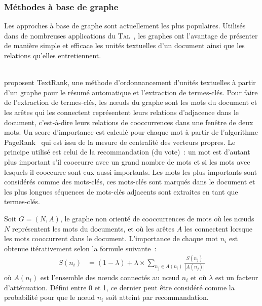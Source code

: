       \subsubsection{Méthodes à base de graphe}
      \label{subsubsec:main-state_of_the_art-automatic_keyphrase_extraction-unsupervised_keyphrase_extraction-graph_based_approaches}
        Les approches à base de graphe sont actuellement les plus populaires.
        Utilisés dans de nombreuses applications du
        \textsc{Tal}~\cite{kozareva2013textgraphs}, les graphes ont l'avantage
        de présenter de manière simple et efficace les unités textuelles d'un
        document ainsi que les relations qu'elles entretiennent.

        ~\\ proposent TextRank, une méthode
        d'ordonnancement d'unités textuelles à partir d'un graphe pour le résumé
        automatique et l'extraction de termes-clés. Pour faire de l'extraction
        de termes-clés, les n\oe{}uds du graphe sont les mots du document et les
        arêtes qui les connectent représentent leurs relations d'adjacence dans
        le document, c'est-à-dire leurs relations de cooccurrences dans une
        fenêtre de deux mots. Un score d'importance est calculé pour chaque mot
        à partir de l'algorithme PageRank~\cite{brin1998pagerank} qui est issu
        de la mesure de centralité des vecteurs propres. Le principe utilisé est
        celui de la recommandation (du vote)~: un mot est d'autant plus
        important s'il cooccurre avec un grand nombre de mots et si les mots
        avec lesquels il cooccurre sont eux aussi importants. Les mots les plus
        importants sont considérés comme des mots-clés, ces mots-clés sont
        marqués dans le document et les plus longues séquences de mots-clés
        adjacents sont extraites en tant que termes-clés.
      
        Soit $G = (N, A)$, le graphe non orienté de cooccurrences de mots où les
        n\oe{}uds $N$ représentent les mots du documents, et où les arêtes $A$
        les connectent lorsque les mots cooccurrent dans le document.
        L'importance de chaque mot $n_i$ est obtenue itérativement selon la
        formule suivante~:
        \begin{align}
          S(n_i) &= (1 - \lambda) + \lambda \times \sum_{n_j \in A(n_i)} \frac{S(n_j)}{|A(n_j)|} \label{math:textrank}
        \end{align}
        où $A(n_i)$ est l'ensemble des n\oe{}uds connectés au n\oe{}ud $n_i$ et
        où $\lambda$ est un facteur d'atténuation. Défini entre 0 et 1, ce
        dernier peut être considéré comme la probabilité pour que le n\oe{}ud
        $n_i$ soit atteint par recommandation.

